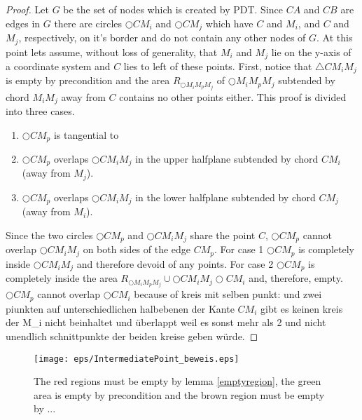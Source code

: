 \begin{proof}

Let $G $ be the set of nodes which is created by PDT. 
Since $CA $ and $CB $ are edges in $G $ there are circles $\bigcirc{CM_i} $ and $\bigcirc{CM_j} $ which have $C $ and $M_i $, and $C $ and $M_j $, respectively, on it's border and do not contain any other nodes of $G $. 
At this point lets assume, without loss of generality, that $M_i $ and $M_j $ lie on the y-axis of a coordinate system and $C $ lies to left of these points.
First, notice that $\triangle{CM_iM_j} $ is empty by precondition and the area $R_{\bigcirc{M_iM_pM_j}} $ of $\bigcirc{M_iM_pM_j} $ subtended by chord $M_iM_j $ away from $C $ contains no other points either.
This proof is divided into three cases.
\begin{enumerate}
\item $\bigcirc{CM_p} $ is tangential to 
\item $\bigcirc{CM_p} $ overlaps $\bigcirc{CM_iM_j} $ in the upper halfplane subtended by chord $CM_i $ (away from $M_j $).
\item $\bigcirc{CM_p} $ overlaps $\bigcirc{CM_iM_j} $ in the lower halfplane subtended by chord $CM_j $ (away from $M_i $).
\end{enumerate}
Since the two circles $\bigcirc{CM_p} $ and $\bigcirc{CM_iM_j} $ share the point $C $, $\bigcirc{CM_p} $ cannot overlap $\bigcirc{CM_iM_j} $ on both sides of the edge $CM_p $.
For case 1 $\bigcirc{CM_p} $ is completely inside $\bigcirc{CM_iM_j} $ and therefore devoid of any points.
For case 2 $\bigcirc{CM_p} $ is completely inside the area $R_{\bigcirc{M_iM_pM_j}} \cup \bigcirc{CM_iM_j} \bigcirc{CM_i} $ and, therefore, empty.
$\bigcirc{CM_p} $ cannot overlap $\bigcirc{CM_i} $ because of 
kreis mit selben punkt: und zwei piunkten auf unterschiedlichen halbebenen der Kante $CM_i $ gibt es keinen kreis der M_i nicht beinhaltet und überlappt weil es sonst mehr als 2 und nicht unendlich schnittpunkte der beiden kreise geben würde.
 
\end{proof}
\begin{figure}[h!]
\centering
\texttt{[image: eps/IntermediatePoint\_beweis.eps]}
\caption{The red regions must be empty by lemma \ref{emptyregion}, the green area is empty by precondition and the brown region must be empty by ... }
\label{fig:intermediate_point_beweis}
\end{figure}


